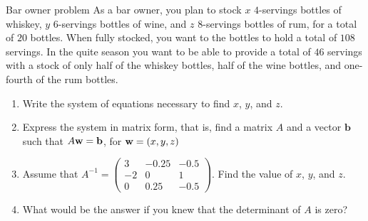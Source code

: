 \documentclass[9pt]{beamer}
\begin{document}
\begin{frame}{Bar owner problem}
    As a bar owner, you plan to stock $x$ $4$-servings bottles of whiskey, $y$ $6$-servings bottles of wine, and $z$ $8$-servings bottles of rum, for a total of $20$ bottles. When fully stocked, you want to the bottles to hold a total of $108$ servings. In the quite season you want to be able to provide a total of $46$ servings with a stock of only half of the whiskey bottles, half of the wine bottles, and one-fourth of the rum bottles. 

\begin{enumerate}[leftmargin = 0.5cm, label = (\alph*), rightmargin = 0.2cm]
    \item Write the system of equations necessary to find $x$, $y$, and $z$.
    \item Express the system in matrix form, that is, find a matrix $A$ and a vector $\pmb{b}$ such that $A{\bf w} = {\bf b}$, for ${\bf w} = (x, y, z)$ 
    \item Assume that 
    $A^{-1} =
    \begin{pmatrix}
        3 & -0.25 & -0.5 \\
        -2 & 0 & 1 \\
        0 & 0.25 & -0.5
    \end{pmatrix}$. 
    Find the value of $x$, $y$, and $z$. 
    \item What would be the answer if you knew that the determinant of $A$ is zero?
\end{enumerate}
\end{frame}
\end{document}
